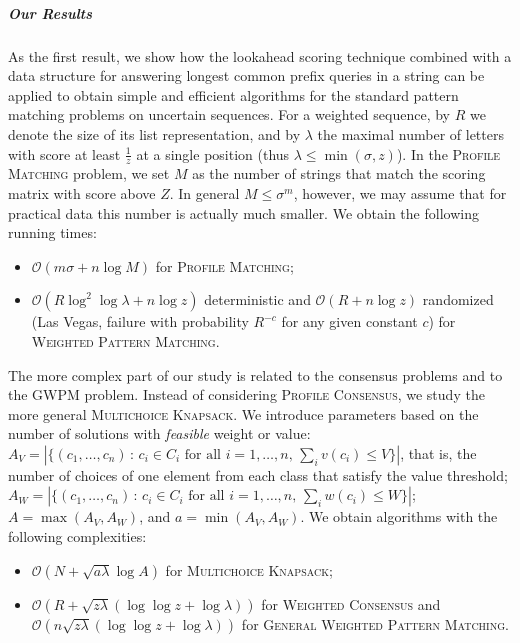 \documentclass{article}
\theoremstyle{plain}
\theoremstyle{definition}
\newcommand{\MK}{\textsc{Multichoice Knapsack}\xspace}
\newcommand{\PM}{\textsc{Profile Matching}\xspace}
\newcommand{\WPM}{\textsc{Weighted Pattern Matching}\xspace}
\newcommand{\GWPM}{\textsc{GWPM}\xspace}
\newcommand{\GWPMFull}{\textsc{General Weighted Pattern Matching}\xspace}
\newcommand{\WC}{\textsc{Weighted Consensus}\xspace}
\newcommand{\PC}{\textsc{Profile Consensus}\xspace}
\newcommand{\Oh}{\mathcal{O}}
\begin{document}
  \subparagraph*{Our Results}
  As the first result, we show how the lookahead scoring technique combined with a data structure
  for answering longest common prefix queries in a string can be applied to obtain simple and efficient
  algorithms for the standard pattern matching problems on uncertain sequences.
  For a weighted sequence, by $R$ we denote the size of its list representation, and by $\lambda$ the
  maximal number of letters with score at least $\frac{1}{z}$ at a single position (thus $\lambda \le \min(\sigma,z)$).
  In the \PM problem, we set $M$ as the number of strings that match the scoring matrix with score above $Z$.
  In general $M \le \sigma^m$, however, we may assume that for practical data this number is actually much smaller.
  We obtain the following running times:
  \begin{itemize}
    \item $\Oh(m\sigma+n \log M)$ for \PM;
    \item $\Oh(R\log^2\log \lambda+n \log z)$ deterministic and $\Oh(R+n \log z)$ randomized (Las Vegas, failure with probability $R^{-c}$
    for any given constant $c$) for \WPM.
  \end{itemize}
  
  The more complex part of our study is related to the consensus problems and to the \GWPM problem.
  Instead of considering \PC, we study the more general \MK.
  We introduce parameters based on the number of solutions with \emph{feasible} weight or value:
  $A_V = |\{(c_1,\ldots,c_n)\,:\,c_i \in C_i\mbox{ for all }i=1,\ldots,n,\,\sum_i v(c_i) \le V\}|$, that is,
  the number of choices of one element from each class that satisfy the value threshold;
  $A_W = |\{(c_1,\ldots,c_n)\,:\,c_i \in C_i\mbox{ for all }i=1,\ldots,n,\,\sum_i w(c_i) \le W\}|$;
  $A = \max(A_V,A_W)$, and $a=\min(A_V,A_W)$.
  We obtain algorithms with the following complexities:
  \begin{itemize}
    \item $\Oh(N+\sqrt{a\lambda} \log A)$ for \MK;
    \item $\Oh(R+\sqrt{z \lambda} (\log \log z+\log \lambda))$ for \WC and $\Oh(n\sqrt{z \lambda} (\log \log z+\log \lambda))$ for \GWPMFull.
  \end{itemize}
  
\end{document}
